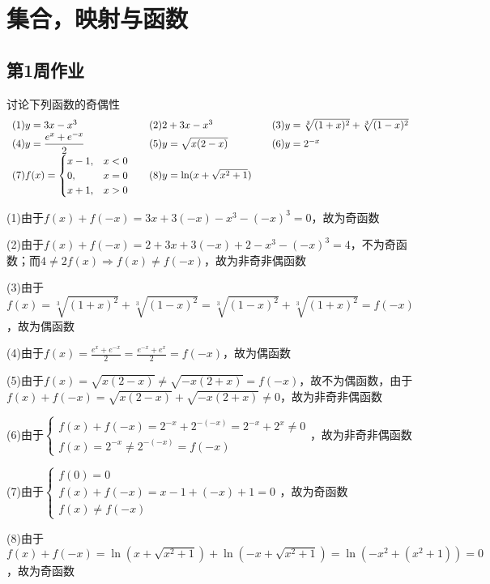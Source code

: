 \chapter{集合，映射与函数}
\section{第1周作业}
\begin{example}{讨论下列函数的奇偶性}{}\vspace{-10pt}
\[\begin{array}{l@{\quad\quad}l@{\quad\quad}l}
    (1)y=3x-x^3&(2)2+3x-x^3&(3)y=\sqrt[3]{(1+x)^2}+\sqrt[3]{(1-x)^2}\\
    (4)y=\dfrac{e^x+e^{-x}}{2}&(5)y=\sqrt{x(2-x)}&(6)y=2^{-x}\\
    (7)f(x)=\begin{cases}x-1,&x<0\\0,&x=0\\x+1,&x>0\end{cases}&(8)y=\ln (x+\sqrt{x^2+1})
\end{array}\]\end{example}
\begin{solution}
    (1)由于$f(x)+f(-x)=3x+3(-x)-x^3-(-x)^3=0$，故为奇函数

    (2)由于$f(x)+f(-x)=2+3x+3(-x)+2-x^3-(-x)^3=4$，不为奇函数；而$4\ne 2f(x)\Rightarrow f(x)\ne f(-x)$，故为非奇非偶函数

    (3)由于$f(x)=\sqrt[3]{(1+x)^2}+\sqrt[3]{(1-x)^2}=\sqrt[3]{(1-x)^2}+\sqrt[3]{(1+x)^2}=f(-x)$，故为偶函数

    (4)由于$f(x)=\frac{e^x+e^{-x}}{2}=\frac{e^{-x}+e^x}{2}=f(-x)$，故为偶函数

    (5)由于$f(x)=\sqrt{x(2-x)}\neq\sqrt{-x(2+x)}=f(-x)$，故不为偶函数，由于$f(x)+f(-x)=\sqrt{x(2-x)}+\sqrt{-x(2+x)}\neq 0$，故为非奇非偶函数

    (6)由于$\begin{cases}f(x)+f(-x)=2^{-x}+2^{-(-x)}=2^{-x}+2^{x}\ne 0\\f(x)=2^{-x}\neq2^{-(-x)}=f(-x)\end{cases}$，故为非奇非偶函数

    (7)由于$\begin{cases}f(0)=0\\f(x)+f(-x)=x-1+(-x)+1=0\\f(x)\neq f(-x)\end{cases}$，故为奇函数

    (8)由于$f(x)+f(-x)=\ln (x+\sqrt{x^2+1})+\ln (-x+\sqrt{x^2+1})=\ln (-x^2+(x^2+1))=0$，故为奇函数
\end{solution}
